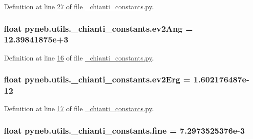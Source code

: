 Definition at line \hyperlink{__chianti__constants_8py_source_l00027}{27} of file \hyperlink{__chianti__constants_8py_source}{\+\_\+chianti\+\_\+constants.\+py}.

\hypertarget{namespacepyneb_1_1utils_1_1__chianti__constants_a847490e29d2f997f05813f55958d4edb}{}
\subsubsection[{ev2\+Ang}]{\setlength{\rightskip}{0pt plus 5cm}float pyneb.\+utils.\+\_\+chianti\+\_\+constants.\+ev2\+Ang = 12.\+39841875e+3}\label{namespacepyneb_1_1utils_1_1__chianti__constants_a847490e29d2f997f05813f55958d4edb}


Definition at line \hyperlink{__chianti__constants_8py_source_l00016}{16} of file \hyperlink{__chianti__constants_8py_source}{\+\_\+chianti\+\_\+constants.\+py}.

\hypertarget{namespacepyneb_1_1utils_1_1__chianti__constants_a0c7ba0e50d6114898e5ede4ee5e6ffa9}{}
\subsubsection[{ev2\+Erg}]{\setlength{\rightskip}{0pt plus 5cm}float pyneb.\+utils.\+\_\+chianti\+\_\+constants.\+ev2\+Erg = 1.\+602176487e-\/12}\label{namespacepyneb_1_1utils_1_1__chianti__constants_a0c7ba0e50d6114898e5ede4ee5e6ffa9}


Definition at line \hyperlink{__chianti__constants_8py_source_l00017}{17} of file \hyperlink{__chianti__constants_8py_source}{\+\_\+chianti\+\_\+constants.\+py}.

\hypertarget{namespacepyneb_1_1utils_1_1__chianti__constants_a4e322555208449fea631150c720abb5a}{}
\subsubsection[{fine}]{\setlength{\rightskip}{0pt plus 5cm}float pyneb.\+utils.\+\_\+chianti\+\_\+constants.\+fine = 7.\+2973525376e-\/3}\label{namespacepyneb_1_1utils_1_1__chianti__constants_a4e322555208449fea631150c720abb5a}



